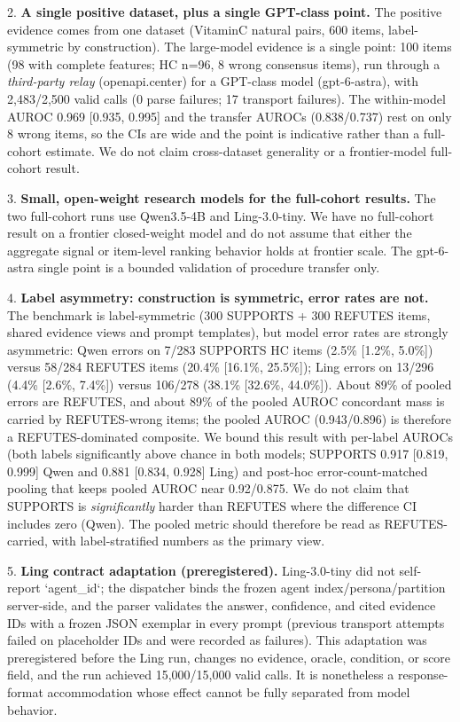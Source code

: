 \documentclass[11pt]{article}
\begin{document}
2. \textbf{A single positive dataset, plus a single GPT-class point.}
   The positive evidence comes from one dataset (VitaminC natural pairs, 600 items, label-symmetric by construction). The large-model evidence is a single point: 100 items (98 with complete features; HC n=96, 8 wrong consensus items), run through a \emph{third-party relay} (openapi.center) for a GPT-class model (gpt-6-astra), with 2,483/2,500 valid calls (0 parse failures; 17 transport failures). The within-model AUROC 0.969 [0.935, 0.995] and the transfer AUROCs (0.838/0.737) rest on only 8 wrong items, so the CIs are wide and the point is indicative rather than a full-cohort estimate. We do not claim cross-dataset generality or a frontier-model full-cohort result.

3. \textbf{Small, open-weight research models for the full-cohort results.}
   The two full-cohort runs use Qwen3.5-4B and Ling-3.0-tiny. We have no full-cohort result on a frontier closed-weight model and do not assume that either the aggregate signal or item-level ranking behavior holds at frontier scale. The gpt-6-astra single point is a bounded validation of procedure transfer only.

4. \textbf{Label asymmetry: construction is symmetric, error rates are not.}
   The benchmark is label-symmetric (300 SUPPORTS + 300 REFUTES items, shared evidence views and prompt templates), but model error rates are strongly asymmetric: Qwen errors on 7/283 SUPPORTS HC items (2.5\% [1.2\%, 5.0\%]) versus 58/284 REFUTES items (20.4\% [16.1\%, 25.5\%]); Ling errors on 13/296 (4.4\% [2.6\%, 7.4\%]) versus 106/278 (38.1\% [32.6\%, 44.0\%]). About 89\% of pooled errors are REFUTES, and about 89\% of the pooled AUROC concordant mass is carried by REFUTES-wrong items; the pooled AUROC (0.943/0.896) is therefore a REFUTES-dominated composite. We bound this result with per-label AUROCs (both labels significantly above chance in both models; SUPPORTS 0.917 [0.819, 0.999] Qwen and 0.881 [0.834, 0.928] Ling) and post-hoc error-count-matched pooling that keeps pooled AUROC near 0.92/0.875. We do not claim that SUPPORTS is \emph{significantly} harder than REFUTES where the difference CI includes zero (Qwen). The pooled metric should therefore be read as REFUTES-carried, with label-stratified numbers as the primary view.

5. \textbf{Ling contract adaptation (preregistered).}
   Ling-3.0-tiny did not self-report `agent\_id`; the dispatcher binds the frozen agent index/persona/partition server-side, and the parser validates the answer, confidence, and cited evidence IDs with a frozen JSON exemplar in every prompt (previous transport attempts failed on placeholder IDs and were recorded as failures). This adaptation was preregistered before the Ling run, changes no evidence, oracle, condition, or score field, and the run achieved 15,000/15,000 valid calls. It is nonetheless a response-format accommodation whose effect cannot be fully separated from model behavior.
\end{document}
